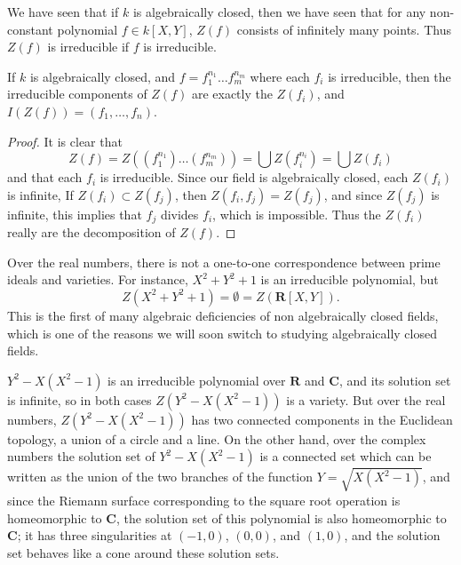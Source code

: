 We have seen that if $k$ is algebraically closed, then we have seen that for any non-constant polynomial $f \in k[X,Y]$, $Z(f)$ consists of infinitely many points. Thus $Z(f)$ is irreducible if $f$ is irreducible.

\begin{corollary}
    If $k$ is algebraically closed, and $f = f_1^{n_1} \dots f_m^{n_m}$ where each $f_i$ is irreducible, then the irreducible components of $Z(f)$ are exactly the $Z(f_i)$, and $I(Z(f)) = (f_1, \dots, f_n)$.
\end{corollary}
\begin{proof}
    It is clear that
    \[ Z(f) = Z((f_1^{n_1}) \dots (f_m^{n_m})) = \bigcup Z(f_i^{n_i}) = \bigcup Z(f_i) \]
    and that each $f_i$ is irreducible. Since our field is algebraically closed, each $Z(f_i)$ is infinite, If $Z(f_i) \subset Z(f_j)$, then $Z(f_i,f_j) = Z(f_j)$, and since $Z(f_j)$ is infinite, this implies that $f_j$ divides $f_i$, which is impossible. Thus the $Z(f_i)$ really are the decomposition of $Z(f)$.
\end{proof}

\begin{example}
    Over the real numbers, there is not a one-to-one correspondence between prime ideals and varieties. For instance, $X^2 + Y^2 + 1$ is an irreducible polynomial, but
    \[ Z(X^2 + Y^2 + 1) = \emptyset = Z(\mathbf{R}[X,Y]). \]
    This is the first of many algebraic deficiencies of non algebraically closed fields, which is one of the reasons we will soon switch to studying algebraically closed fields.
\end{example}

\begin{example}
    $Y^2 - X(X^2 - 1)$ is an irreducible polynomial over $\mathbf{R}$ and $\mathbf{C}$, and its solution set is infinite, so in both cases $Z(Y^2 - X(X^2 - 1))$ is a variety. But over the real numbers, $Z(Y^2 - X(X^2 - 1))$ has two connected components in the Euclidean topology, a union of a circle and a line. On the other hand, over the complex numbers the solution set of $Y^2 - X(X^2 - 1)$ is a connected set which can be written as the union of the two branches of the function $Y = \sqrt{X(X^2 - 1)}$, and since the Riemann surface corresponding to the square root operation is homeomorphic to $\mathbf{C}$, the solution set of this polynomial is also homeomorphic to $\mathbf{C}$; it has three singularities at $(-1,0)$, $(0,0)$, and $(1,0)$, and the solution set behaves like a cone around these solution sets.
\end{example}

